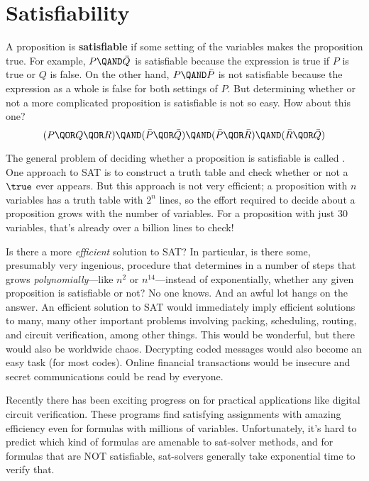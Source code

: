 \section{Satisfiability}\label{SAT_sec}

A proposition is \textbf{satisfiable} if some setting of the variables
makes the proposition true.  For example, $P \QAND \bar{Q}$ is
satisfiable because the expression is true if $P$ is true or $Q$ is
false.  On the other hand, $P \QAND \bar{P}$ is not satisfiable because
the expression as a whole is false for both settings of $P$.  But
determining whether or not a more complicated proposition is satisfiable
is not so easy.  How about this one?
%
\[
(P \QOR Q \QOR R) \QAND (\bar P \QOR \bar Q)
                  \QAND (\bar P \QOR \bar R)
                  \QAND (\bar R \QOR \bar Q)
\]

The general problem of deciding whether a proposition is satisfiable
is called .  One approach to SAT is to construct a truth
table and check whether or not a $\true$ ever appears.  But this
approach is not very efficient; a proposition with $n$ variables has a
truth table with $2^n$ lines, so the effort required to decide about a
proposition grows  with the number of variables.
For a proposition with just 30 variables, that's already over a
billion lines to check!

Is there a more \textit{efficient} solution to SAT?  In particular, is
there some, presumably very ingenious, procedure that determines in a
number of steps that grows \emph{polynomially}---like $n^2$ or
$n^{14}$---instead of exponentially, whether any given proposition is
satisfiable or not?  No one knows.  And an awful lot hangs on the
answer.  An efficient solution to SAT would immediately imply
efficient solutions to many, many other important problems involving
packing, scheduling, routing, and circuit verification, among other
things.  This would be wonderful, but there would also be worldwide
chaos.  Decrypting coded messages would also become an easy task (for
most codes).  Online financial transactions would be insecure and
secret communications could be read by everyone.

Recently there has been exciting progress on  for
practical applications like digital circuit verification.  These
programs find satisfying assignments with amazing efficiency even for
formulas with millions of variables.  Unfortunately, it's hard to
predict which kind of formulas are amenable to sat-solver methods, and
for formulas that are NOT satisfiable, sat-solvers generally take
exponential time to verify that.

